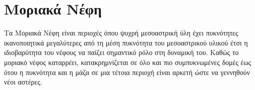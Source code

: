 \documentclass[article,a4paper,11.2pt]{memoir}
\numberwithin{equation}{subsection}
\begin{document}
%


\section{Μοριακά Νέφη}
Τα Μοριακά Νέφη είναι περιοχές όπου ψυχρή μεσοαστρική ύλη έχει πυκνότητες ικανοποιητικά μεγαλύτερες από τη μέση πυκνότητα του μεσοαστρικού υλικού έτσι η ιδιοβαρύτητα του νέφους να παίζει σημαντικό ρόλο στη δυναμική του. Καθώς το μοριακό νέφος καταρρέει, κατακρημνίζεται σε όλο και πιο συμπυκνωμένες δομές έως ότου η πυκνότητα και η μάζα σε μια τέτοια περιοχή είναι αρκετή ώστε να γεννηθούν νέοι αστέρες.   
\end{document}
